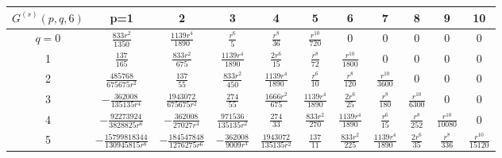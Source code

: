 \documentclass[a4paper,aps,preprint,groupedaddress,showpacs]{revtex4}
\begin{document}
\vspace{40pt}
\begin{tabular}{c|cccccccccc}
\hline\hline
$G^{(s)}(p,q,6)$ & p=1 & 2 & 3 & 4 & 5 & 6 & 7 & 8 & 9 & 10 \\
\hline
$q=0$ & $\frac{833r^{2}}{1350}$ & $\frac{1139r^{4}}{1890}$ &
$\frac{r^{6}}{5}$ & $\frac{r^{8}}{36}$ & $\frac{r^{10}}{720}$ & 
0 & 0 & 0 & 0 & 0 \\
1 & $\frac{137}{165}$ & $\frac{833r^{2}}{675}$ &
$\frac{1139r^{4}}{1890}$ & $\frac{2r^{6}}{15}$ &  
$\frac{r^{8}}{72}$ &
$\frac{r^{10}}{1800}$ & 0 & 0 & 0 & 0 \\
2 & $\frac{485768}{675675r^{2}}$ & $\frac{137}{55}$ &
$\frac{833r^{2}}{450}$ & $\frac{1139r^{4}}{1890}$ &
$\frac{r^{6}}{10}$ & $\frac{r^{8}}{120}$ & 
$\frac{r^{10}}{3600}$ & 0 & 0 & 0 \\
3 & $-\frac{362008}{135135r^{4}}$ & $\frac{1943072}{675675r^{2}}$ &
$\frac{274}{55}$ & $\frac{1666r^{2}}{675}$ &
$\frac{1139r^{4}}{1890}$ & $\frac{2r^{6}}{25}$ & 
$\frac{r^{8}}{180}$ & $\frac{r^{10}}{6300}$ & 0 & 0\\
4 & $-\frac{92273924}{3828825r^{6}}$ & $-\frac{362008}{27027r^{4}}$ &
$\frac{971536}{135135r^{2}}$ & $\frac{274}{33}$ &
$\frac{833r^{2}}{270}$ & $\frac{1139r^{4}}{1890}$ &
$\frac{r^{6}}{15}$ & $\frac{r^{8}}{252}$ & 
$\frac{r^{10}}{10080}$ & 0 \\
5 & $-\frac{15799818344}{130945815r^{8}}$ &
$-\frac{184547848}{1276275r^{6}}$ & $-\frac{362008}{9009r^{4}}$ &
$\frac{1943072}{135135r^{2}}$ & $\frac{137}{11}$ &
$\frac{833r^{2}}{225}$ & $\frac{1139r^{4}}{1890}$ &
$\frac{2r^{6}}{35}$ & $\frac{r^{8}}{336}$ & 
$\frac{r^{10}}{15120}$ \\
\hline\hline
\end{tabular}
\end{document}
